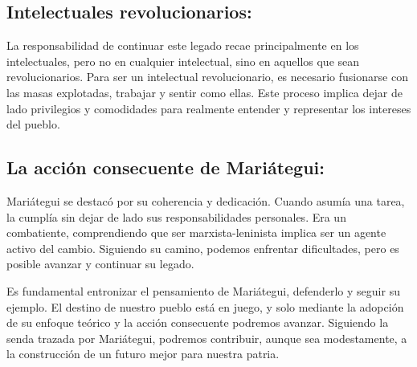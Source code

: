 \documentclass[
  letterpaper,
  DIV=11,
  numbers=noendperiod]{scrartcl}
\begin{document}
\hypertarget{intelectuales-revolucionarios}{%
\subsection{Intelectuales
revolucionarios:}\label{intelectuales-revolucionarios}}

La responsabilidad de continuar este legado recae principalmente en los
intelectuales, pero no en cualquier intelectual, sino en aquellos que
sean revolucionarios. Para ser un intelectual revolucionario, es
necesario fusionarse con las masas explotadas, trabajar y sentir como
ellas. Este proceso implica dejar de lado privilegios y comodidades para
realmente entender y representar los intereses del pueblo.

\hypertarget{la-acciuxf3n-consecuente-de-mariuxe1tegui}{%
\subsection{La acción consecuente de
Mariátegui:}\label{la-acciuxf3n-consecuente-de-mariuxe1tegui}}

Mariátegui se destacó por su coherencia y dedicación. Cuando asumía una
tarea, la cumplía sin dejar de lado sus responsabilidades personales.
Era un combatiente, comprendiendo que ser marxista-leninista implica ser
un agente activo del cambio. Siguiendo su camino, podemos enfrentar
dificultades, pero es posible avanzar y continuar su legado.

Es fundamental entronizar el pensamiento de Mariátegui, defenderlo y
seguir su ejemplo. El destino de nuestro pueblo está en juego, y solo
mediante la adopción de su enfoque teórico y la acción consecuente
podremos avanzar. Siguiendo la senda trazada por Mariátegui, podremos
contribuir, aunque sea modestamente, a la construcción de un futuro
mejor para nuestra patria.


\printbibliography
\end{document}
